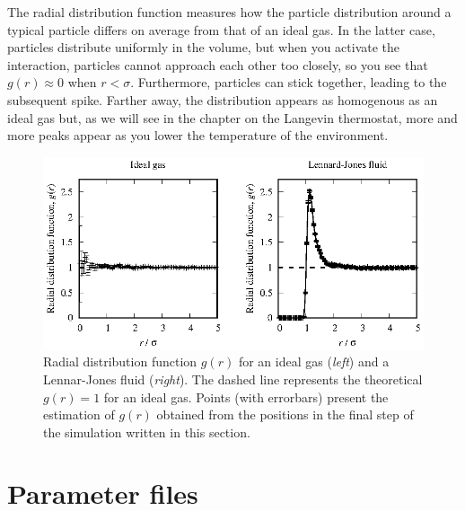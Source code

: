 The radial distribution function measures how the particle distribution around a
typical particle differs on average from that of an ideal gas. In the latter
case, particles distribute uniformly in the volume, but when you activate the
interaction, particles cannot approach each other too closely, so you see that
$g(r) \approx 0$ when $r < \sigma$. Furthermore, particles can stick together,
leading to the subsequent spike. Farther away, the distribution appears as
homogenous as an ideal gas but, as we will see in the chapter on the Langevin
thermostat, more and more peaks appear as you lower the temperature of the
environment.

\begin{figure}
  \includegraphics[width = \textwidth]{figures/Lennard-Jones.rdf.eps}
  \caption{\label{Lennard-Jones.rdf}Radial distribution function $g(r)$ for an
           ideal gas (\textit{left}) and a Lennar-Jones fluid (\textit{right}).
           The dashed line represents the theoretical $g(r) = 1$ for an ideal
           gas. Points (with errorbars) present the estimation of $g(r)$
           obtained from the positions in the final step of the simulation
           written in this section.}
\end{figure}

\section{Parameter files}

